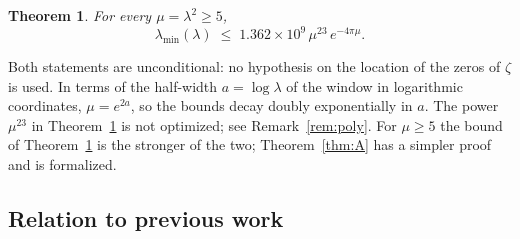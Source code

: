 \documentclass[11pt]{amsart}
\newtheorem{theorem}{Theorem}
\theoremstyle{definition}
\theoremstyle{remark}
\numberwithin{equation}{section}
\begin{document}
\begin{theorem}\label{thm:B}
For every $\mu=\lambda^2\ge5$,
\[
\lambda_{\min}(\lambda)\;\le\;1.362\times10^{9}\,\mu^{23}\,e^{-4\pi\mu} .
\]
\end{theorem}

Both statements are unconditional: no hypothesis on the location of the zeros of $\zeta$ is used. In terms of the half-width $a=\log\lambda$ of the window in logarithmic coordinates, $\mu=e^{2a}$, so the bounds decay doubly exponentially in $a$. The power $\mu^{23}$ in Theorem~\ref{thm:B} is not optimized; see Remark~\ref{rem:poly}. For $\mu\ge5$ the bound of Theorem~\ref{thm:B} is the stronger of the two; Theorem~\ref{thm:A} has a simpler proof and is formalized.

\subsection{Relation to previous work}
\end{document}
